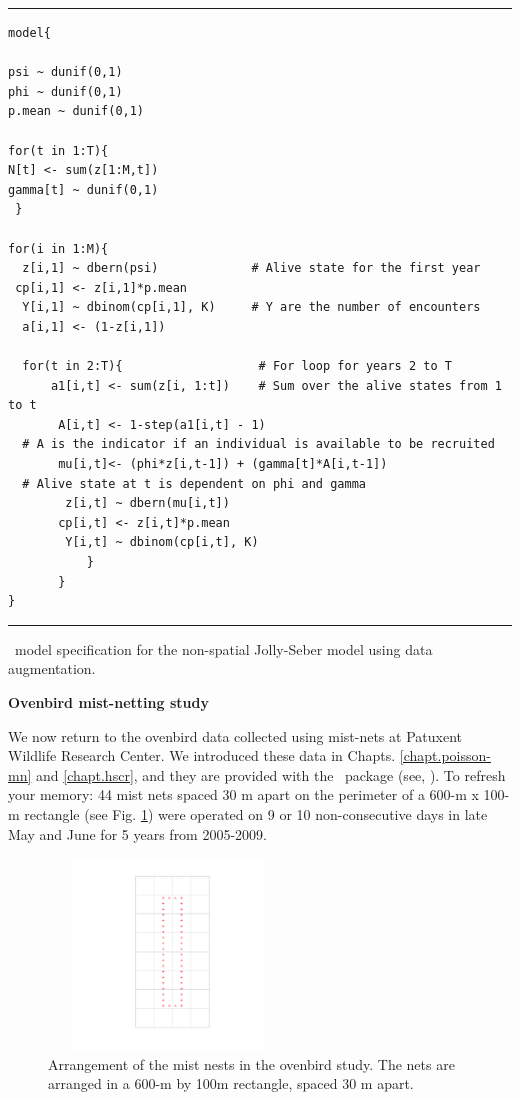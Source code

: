 \begin{panel}[htp]
\centering
\rule[0.1in]{\textwidth}{.03in}
{\small
\begin{verbatim}
model{

psi ~ dunif(0,1)
phi ~ dunif(0,1)
p.mean ~ dunif(0,1)

for(t in 1:T){
N[t] <- sum(z[1:M,t])
gamma[t] ~ dunif(0,1)
 }

for(i in 1:M){
  z[i,1] ~ dbern(psi)	          # Alive state for the first year
 cp[i,1] <- z[i,1]*p.mean
  Y[i,1] ~ dbinom(cp[i,1], K)     # Y are the number of encounters
  a[i,1] <- (1-z[i,1])

  for(t in 2:T){                   # For loop for years 2 to T
      a1[i,t] <- sum(z[i, 1:t])    # Sum over the alive states from 1 to t
       A[i,t] <- 1-step(a1[i,t] - 1)  
  # A is the indicator if an individual is available to be recruited
       mu[i,t]<- (phi*z[i,t-1]) + (gamma[t]*A[i,t-1])
  # Alive state at t is dependent on phi and gamma
        z[i,t] ~ dbern(mu[i,t])   
       cp[i,t] <- z[i,t]*p.mean
        Y[i,t] ~ dbinom(cp[i,t], K)
           }  
       } 
} 
\end{verbatim}
}

\rule[-0.1in]{\textwidth}{.03in}
\caption{
\jags~model specification for the non-spatial Jolly-Seber model using
data augmentation. }
\label{open.panel.nsJS}
\end{panel}


{\flushleft \bf Ovenbird mist-netting study}

We now return to the ovenbird data collected using mist-nets at
Patuxent Wildlife Research Center. We introduced these data 
 in Chapts. \ref{chapt.poisson-mn} and \ref{chapt.hscr}, and they are provided with the 
 \secr~package (see, \citet{efford_etal:2004,
  borchers_efford:2008}). To refresh your memory: 44 mist nets spaced
30 m apart on the perimeter of a 600-m x 100-m rectangle (see
Fig. \ref{open.figs.ovenbirdlocs}) were operated on 9 or 10 non-consecutive days in late May
and June for 5 years from 2005-2009.

\begin{figure}
\centering
\includegraphics[height=2in,width=2.5in]{Ch16-Open/figs/ovenbirds.pdf}
\caption{Arrangement of the mist nests in the ovenbird study.  The nets are arranged in a 600-m by 100m
rectangle, spaced 30 m apart. }
\label{open.figs.ovenbirdlocs}
\end{figure}


